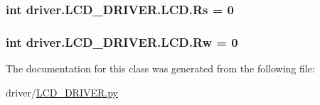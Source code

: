 \subsubsection[{Rs}]{\setlength{\rightskip}{0pt plus 5cm}int driver.\+L\+C\+D\+\_\+\+D\+R\+I\+V\+E\+R.\+L\+C\+D.\+Rs = 0\hspace{0.3cm}{\ttfamily [static]}}\label{classdriver_1_1LCD__DRIVER_1_1LCD_a35d42fe004231a154653b30da370cbdc}
\hypertarget{classdriver_1_1LCD__DRIVER_1_1LCD_aa414dbce7b4b58751c5c08c8cf5bb406}{}
\subsubsection[{Rw}]{\setlength{\rightskip}{0pt plus 5cm}int driver.\+L\+C\+D\+\_\+\+D\+R\+I\+V\+E\+R.\+L\+C\+D.\+Rw = 0\hspace{0.3cm}{\ttfamily [static]}}\label{classdriver_1_1LCD__DRIVER_1_1LCD_aa414dbce7b4b58751c5c08c8cf5bb406}


The documentation for this class was generated from the following file\+:\begin{DoxyCompactItemize}
\item 
driver/\hyperlink{LCD__DRIVER_8py}{L\+C\+D\+\_\+\+D\+R\+I\+V\+E\+R.\+py}\end{DoxyCompactItemize}

